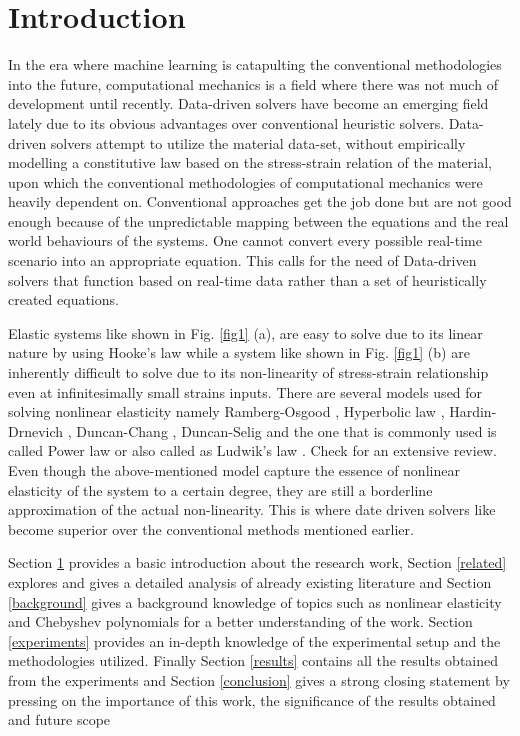 \documentclass[conference]{IEEEtran}
\begin{document}
\section{Introduction}
\label{introduction}
In the era where machine learning is catapulting the conventional methodologies into the future, computational mechanics is a field where there was not much of development until recently. Data-driven solvers have become an emerging field lately due to its obvious advantages over conventional heuristic solvers. Data-driven solvers attempt to utilize the material data-set, without empirically modelling a constitutive law based on the stress-strain relation of the material, upon which the conventional methodologies of computational mechanics were heavily dependent on. Conventional approaches get the job done but are not good enough because of the unpredictable mapping between the equations and the real world behaviours of the systems. One cannot convert every possible real-time scenario into an appropriate equation. This calls for the need of Data-driven solvers that function based on real-time data rather than a set of heuristically created equations. 

Elastic systems like shown in Fig. \ref{fig1} (a), are easy to solve due to its linear nature by using Hooke’s law \cite{1} while a system like shown in Fig. \ref{fig1} (b) are inherently difficult to solve due to its non-linearity of stress-strain relationship even at infinitesimally small strains inputs. There are several models used for solving nonlinear elasticity namely Ramberg-Osgood \cite{2}, Hyperbolic law \cite{3}, Hardin-Drnevich \cite{4}, Duncan-Chang \cite{5}, Duncan-Selig \cite{6} and the one that is commonly used is called Power law or also called as Ludwik’s law \cite{7}. Check \cite{19} for an extensive review. Even though the above-mentioned model capture the essence of nonlinear elasticity of the system to a certain degree, they are still a borderline approximation of the actual non-linearity. This is where date driven solvers like \cite{8,9,10,11,12,13,14,15,16,17,18} become superior over the conventional methods mentioned earlier. 

Section \ref{introduction} provides a basic introduction about the research work, Section \ref{related} explores and gives a detailed analysis of already existing literature and Section \ref{background} gives a background knowledge of topics such as nonlinear elasticity and Chebyshev polynomials for a better understanding of the work. Section \ref{experiments} provides an in-depth knowledge of the experimental setup and the methodologies utilized. Finally Section \ref{results} contains all the results obtained from the experiments and Section \ref{conclusion} gives a strong closing statement by pressing on the importance of this work, the significance of the results obtained and future scope
\end{document}
